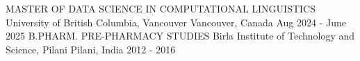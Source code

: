 

\begin{cventries}

  \cventry
  {MASTER OF DATA SCIENCE IN COMPUTATIONAL LINGUISTICS} %
  {University of British Columbia, Vancouver} %
  {Vancouver, Canada} %
  {Aug 2024 - June 2025} %
  {}
\vspace{1em}
\cventry
{B.PHARM. PRE-PHARMACY STUDIES} %
{Birla Institute of Technology and Science, Pilani} %
{Pilani, India} %
{2012 - 2016} %
{}
\end{cventries}
